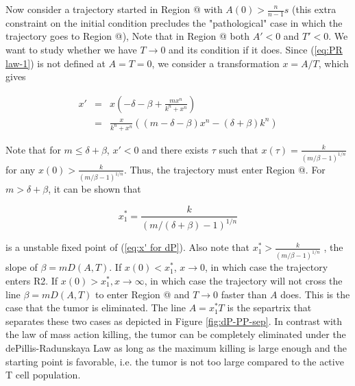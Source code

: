 \documentclass[review,authoryear]{elsarticle}
\makeatletter
\newcommand*{\rom}[1]{\expandafter\@slowromancap\romannumeral #1@}
\makeatother
\begin{document}
Now consider a trajectory started in Region \rom{1} with $A(0)>\frac{n}{n-1}s$ (this extra constraint on the initial condition precludes the "pathological" case in which the trajectory goes to Region \rom{4}),
Note that in Region \rom{1} both $A'<0$ and $T'<0$. We want to study whether we have $T\to0$ and its condition if it does. Since (\ref{eq:PR law-1}) is not defined at $A=T=0$, we consider
a transformation $x=A/T$, which gives  
\begin{linenomath*}
\begin{eqnarray}
x' & = & x(-\delta-\beta+\frac{mx^{n}}{k^{n}+x^{n}})\label{eq:x' for dP}\\
 & = & \frac{x}{k^{n}+x^{n}}((m-\delta-\beta)x^{n}-(\delta+\beta)k^{n})\nonumber 
\end{eqnarray}
\end{linenomath*}
Note that for $m\le\delta+\beta$, $x'<0$ and there exists $\tau$
such that $x(\tau)=\frac{k}{(m/\beta-1)^{1/n}}$ for any $x(0)>\frac{k}{(m/\beta-1)^{1/n}}$.
Thus, the trajectory must enter Region \rom{2}. For $m>\delta+\beta$, it can
be shown that 
\begin{linenomath*}
\[
x_{1}^{*}=\frac{k}{(m/(\delta+\beta)-1)^{1/n}}
\]
\end{linenomath*}
 is a unstable fixed point of (\ref{eq:x' for dP}). Also note that
$x_{1}^{*}>\frac{k}{(m/\beta-1)^{1/n}}$ , the slope of $\beta=mD(A,T)$.
If $x(0)<x_{1}^{*}$, $x\to0$, in which case the trajectory enters
R2. If $x(0)>x_{1}^{*},x\to\infty$, in which case the trajectory
will not cross the line $\beta=mD(A,T)$ to enter Region \rom{2} and $T\to0$
faster than $A$ does. This is the case that the tumor is eliminated.
The line $A=x_{1}^{*}T$ is the separtrix that separates these two cases
as depicted in Figure \ref{fig:dP-PP-sep}. In contrast with the law
of mass action killing, the tumor can be completely eliminated under the
dePillis-Radunskaya Law as long as the maximum killing is large enough
and the starting point is favorable, i.e. the tumor is not too large
compared to the active T cell population. 
\end{document}
